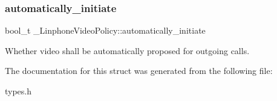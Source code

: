 \subsubsection{automatically\+\_\+initiate}
{\footnotesize\ttfamily bool\+\_\+t \+\_\+\+Linphone\+Video\+Policy\+::automatically\+\_\+initiate}



Whether video shall be automatically proposed for outgoing calls. 



The documentation for this struct was generated from the following file\+:\begin{DoxyCompactItemize}
\item 
types.\+h\end{DoxyCompactItemize}
